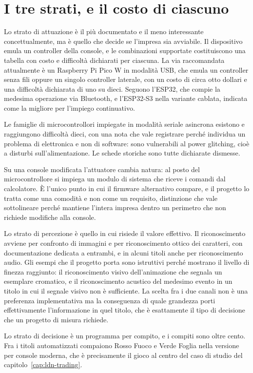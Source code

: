 \section{I tre strati, e il costo di ciascuno}

Lo strato di attuazione è il più documentato e il meno interessante concettualmente, ma è quello che decide se l'impresa sia avviabile. Il dispositivo emula un controller della console, e le combinazioni supportate costituiscono una tabella con costo e difficoltà dichiarati per ciascuna. La via raccomandata attualmente è un Raspberry Pi Pico W in modalità USB, che emula un controller senza fili oppure un singolo controller laterale, con un costo di circa otto dollari e una difficoltà dichiarata di uno su dieci. Seguono l'ESP32, che compie la medesima operazione via Bluetooth, e l'ESP32-S3 nella variante cablata, indicata come la migliore per l'impiego continuativo.

Le famiglie di microcontrollori impiegate in modalità seriale asincrona esistono e raggiungono difficoltà dieci, con una nota che vale registrare perché individua un problema di elettronica e non di software: sono vulnerabili al power glitching, cioè a disturbi sull'alimentazione. Le schede storiche sono tutte dichiarate dismesse.

Su una console modificata l'attuatore cambia natura: al posto del microcontrollore si impiega un modulo di sistema che riceve i comandi dal calcolatore. È l'unico punto in cui il firmware alternativo compare, e il progetto lo tratta come una comodità e non come un requisito, distinzione che vale sottolineare perché mantiene l'intera impresa dentro un perimetro che non richiede modifiche alla console.

Lo strato di percezione è quello in cui risiede il valore effettivo. Il riconoscimento avviene per confronto di immagini e per riconoscimento ottico dei caratteri, con documentazione dedicata a entrambi, e in alcuni titoli anche per riconoscimento audio. Gli esempi che il progetto porta sono istruttivi perché mostrano il livello di finezza raggiunto: il riconoscimento visivo dell'animazione che segnala un esemplare cromatico, e il riconoscimento acustico del medesimo evento in un titolo in cui il segnale visivo non è sufficiente. La scelta fra i due canali non è una preferenza implementativa ma la conseguenza di quale grandezza porti effettivamente l'informazione in quel titolo, che è esattamente il tipo di decisione che un progetto di misura richiede.

Lo strato di decisione è un programma per compito, e i compiti sono oltre cento. Fra i titoli automatizzati compaiono Rosso Fuoco e Verde Foglia nella versione per console moderna, che è precisamente il gioco al centro del caso di studio del capitolo~\ref{cap:ldn-trading}.


